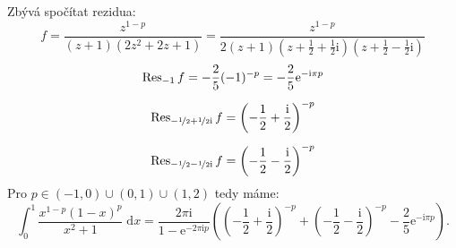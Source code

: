 \documentclass[10pt,a4paper]{article}
\newcommand{\const}[1]{\text{#1}}
\newcommand{\Res}{\operatorname{Res}}
\renewcommand{\d}[1]{\;\const{d}#1}
\newcommand{\e}[1]{\const{e}^{#1}}
\renewcommand{\i}{\const{i}}
\begin{document}
Zbývá spočítat rezidua:
\begin{equation*}
    f = \frac{z^{1-p}}{(z+1)(2z^2 + 2z + 1)}
    = \frac{z^{1-p}}{2(z+1)(z+\frac{1}{2}+\frac{1}{2} \i)(z+\frac{1}{2}-\frac{1}{2} \i)}
\end{equation*}
\begin{gather*}
    \Res_{-1} f = -\frac{2}{5} (-1)^{-p} = -\frac{2}{5} \e{-\i\pi p} \\[5pt]
    \Res_{-\nicefrac{1}{2} + \nicefrac{1}{2} \i} f = \left(-\frac{1}{2} + \frac{\i}{2}\right)^{-p} \\[5pt]
    \Res_{-\nicefrac{1}{2} - \nicefrac{1}{2} \i} f = \left(-\frac{1}{2} - \frac{\i}{2}\right)^{-p}
\end{gather*}
Pro $p \in (-1, 0) \cup (0, 1) \cup (1, 2)$ tedy máme:
\begin{equation*}
    \int_0^1 \frac{x^{1-p} (1-x)^p}{x^2+1} \d{x}
    = \frac{2\pi\i}{1 - \e{-2\pi\i p}} \left(
        \left(-\frac{1}{2} + \frac{\i}{2}\right)^{-p} +
        \left(-\frac{1}{2} - \frac{\i}{2}\right)^{-p} -
        \frac{2}{5} \e{-\i\pi p}
    \right).
\end{equation*}
\end{document}
